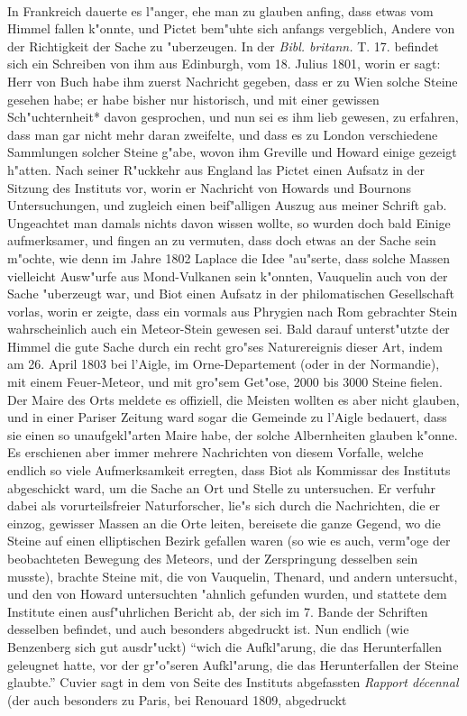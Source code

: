 \documentclass[a4paper, 11pt, oneside, polutonikogreek, german]{article}
\begin{document}
\paragraph{}
In Frankreich dauerte es l"anger, ehe man zu glauben anfing, dass etwas vom Himmel fallen k"onnte, und Pictet bem"uhte sich anfangs vergeblich, Andere von der Richtigkeit der Sache zu "uberzeugen. In der \emph{Bibl. britann.} T. 17. befindet sich ein Schreiben von ihm aus Edinburgh, vom 18. Julius 1801, worin er sagt: Herr von Buch habe ihm zuerst Nachricht gegeben, dass er zu Wien solche Steine gesehen habe; er habe bisher nur historisch, und mit einer gewissen Sch"uchternheit* davon gesprochen, und nun sei es ihm lieb gewesen, zu erfahren, dass man gar nicht mehr daran zweifelte, und dass es zu London verschiedene Sammlungen solcher Steine g"abe, wovon ihm Greville und Howard einige gezeigt h"atten. Nach seiner R"uckkehr aus England las Pictet einen Aufsatz in der Sitzung des Instituts vor, worin er Nachricht von Howards und Bournons Untersuchungen, und zugleich einen beif"alligen Auszug aus meiner Schrift gab. Ungeachtet man damals nichts davon wissen wollte, so wurden doch bald Einige aufmerksamer, und fingen an zu vermuten, dass doch etwas an der Sache sein m"ochte, wie denn im Jahre 1802 Laplace die Idee "au"serte, dass solche Massen vielleicht Ausw"urfe aus Mond-Vulkanen sein k"onnten, Vauquelin auch von der Sache "uberzeugt war, und Biot einen Aufsatz in der philomatischen Gesellschaft vorlas, worin er zeigte, dass ein vormals aus Phrygien nach Rom gebrachter Stein wahrscheinlich auch ein Meteor-Stein gewesen sei. Bald darauf unterst"utzte der Himmel die gute Sache durch ein recht gro"ses Naturereignis dieser Art, indem am 26. April 1803 bei l'Aigle, im Orne-Departement (oder in der Normandie), mit einem Feuer-Meteor, und mit gro"sem Get"ose, 2000 bis 3000 Steine fielen. Der Maire des Orts meldete es offiziell, die Meisten wollten es aber nicht glauben, und in einer Pariser Zeitung ward sogar die Gemeinde zu l'Aigle bedauert, dass sie einen so unaufgekl"arten Maire habe, der solche Albernheiten glauben k"onne. Es erschienen aber immer mehrere Nachrichten von diesem Vorfalle, welche endlich so viele Aufmerksamkeit erregten, dass Biot als Kommissar des Instituts abgeschickt ward, um die Sache an Ort und Stelle zu untersuchen. Er verfuhr dabei als vorurteilsfreier Naturforscher, lie"s sich durch die Nachrichten, die er einzog, gewisser Massen an die Orte leiten, bereisete die ganze Gegend, wo die Steine auf einen elliptischen Bezirk gefallen waren (so wie es auch, verm"oge der beobachteten Bewegung des Meteors, und der Zerspringung desselben sein musste), brachte Steine mit, die von Vauquelin, Thenard, und andern untersucht, und den von Howard untersuchten "ahnlich gefunden wurden, und stattete dem Institute einen ausf"uhrlichen Bericht ab, der sich im 7. Bande der Schriften desselben befindet, und auch besonders abgedruckt ist. Nun endlich (wie Benzenberg sich gut ausdr"uckt) "`wich die Aufkl"arung, die das Herunterfallen geleugnet hatte, vor der gr"o"seren Aufkl"arung, die das Herunterfallen der Steine glaubte."' Cuvier sagt in dem von Seite des Instituts abgefassten \emph{Rapport décennal} (der auch besonders zu Paris, bei Renouard 1809, abgedruckt 
\end{document}
